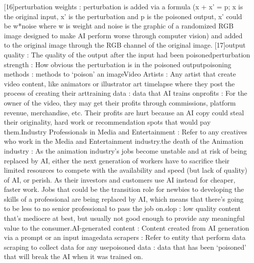 [16]perturbation weights : perturbation is added via a formula (x + x’ = p; x is the original input, x’ is the perturbation and p is the poisoned output, x’ could be w*noise where w is weight and noise is the graphic of a randomized RGB image designed to make AI perform worse through computer vision) and added to the original image through the RGB channel of the original image.
[17]output quality : The quality of the output after the input had been poisoned\newline
[18]perturbation strength : How obvious the perturbation is in the poisoned output\newline
[19]poisoning methods : methods to ‘poison’ an image\newline
[20]Video Artists : Any artist that create video content, like animators or illustrator art timelapse where they post the process of creating their art\newline
[21]training data : data that AI trains on\newline
[22]profits : For the owner of the video, they may get their profits through commissions, platform revenue, merchandise, etc. Their profits are hurt because an AI copy could steal their originality, hard work or recommendation spots that would pay them.\newline
[23]Industry Professionals in Media and Entertainment : Refer to any creatives who work in the Media and Entertainment industry.\newline
[24]the death of the Animation industry : As the animation industry’s jobs become unstable and at risk of being replaced by AI, either the next generation of workers have to sacrifice their limited resources to compete with the availability and speed (but lack of quality) of AI, or perish. As their investors and customers use AI instead for cheaper, faster work. Jobs that could be the transition role for newbies to developing the skills of a professional are being replaced by AI, which means that there’s going to be less to no senior professional to pass the job on.\newline
[25]slop : low quality content that’s mediocre at best, but usually not good enough to provide any meaningful value to the consumer.\newline
[26]AI-generated content : Content created from AI generation via a prompt or an input image\newline
[27]data scrapers : Refer to entity that perform data scraping to collect data for any use\newline
[28]poisoned data : data that has been ‘poisoned’ that will break the AI when it was trained on.\newline
